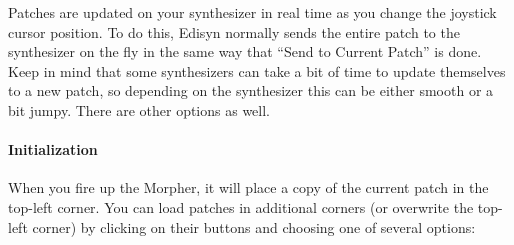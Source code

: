 \documentclass{article}
\begin{document}
Patches are updated on your synthesizer in real time as you change the joystick cursor position.  To do this, Edisyn normally sends the entire patch to the synthesizer on the fly in the same way that ``Send to Current Patch'' is done.  Keep in mind that some synthesizers can take a bit of time to update themselves to a new patch, so depending on the synthesizer this can be either smooth or a bit jumpy.  There are other options as well.

\paragraph{Initialization} When you fire up the Morpher, it will place a copy of the current patch in the top-left corner.  You can load patches in additional corners (or overwrite the top-left corner) by clicking on their buttons and choosing one of several options:
\end{document}
